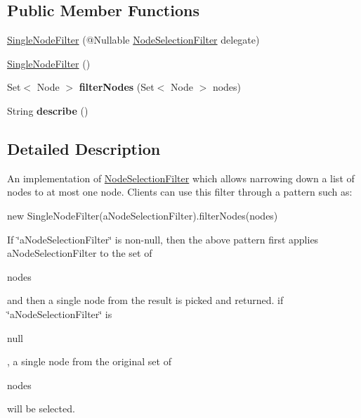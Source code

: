 \subsection*{Public Member Functions}
\begin{DoxyCompactItemize}
\item 
\hyperlink{classcom_1_1google_1_1devrel_1_1wcl_1_1filters_1_1SingleNodeFilter_a66d8bc70e29fe674e0f6030d2419281c}{Single\+Node\+Filter} (@Nullable \hyperlink{interfacecom_1_1google_1_1devrel_1_1wcl_1_1filters_1_1NodeSelectionFilter}{Node\+Selection\+Filter} delegate)
\item 
\hyperlink{classcom_1_1google_1_1devrel_1_1wcl_1_1filters_1_1SingleNodeFilter_a80572ec2194bd5b7d1a7c76ad6ae01a2}{Single\+Node\+Filter} ()
\item 
Set$<$ Node $>$ {\bfseries filter\+Nodes} (Set$<$ Node $>$ nodes)\hypertarget{classcom_1_1google_1_1devrel_1_1wcl_1_1filters_1_1SingleNodeFilter_a62c4faedd0e963a62a48838d0a4b5a95}{}\label{classcom_1_1google_1_1devrel_1_1wcl_1_1filters_1_1SingleNodeFilter_a62c4faedd0e963a62a48838d0a4b5a95}

\item 
String {\bfseries describe} ()\hypertarget{classcom_1_1google_1_1devrel_1_1wcl_1_1filters_1_1SingleNodeFilter_a28b67b1962e3d83f075ce159d10706c8}{}\label{classcom_1_1google_1_1devrel_1_1wcl_1_1filters_1_1SingleNodeFilter_a28b67b1962e3d83f075ce159d10706c8}

\end{DoxyCompactItemize}


\subsection{Detailed Description}
An implementation of \hyperlink{interfacecom_1_1google_1_1devrel_1_1wcl_1_1filters_1_1NodeSelectionFilter}{Node\+Selection\+Filter} which allows narrowing down a list of nodes to at most one node. Clients can use this filter through a pattern such as\+: 
\begin{DoxyPre}
    new SingleNodeFilter(aNodeSelectionFilter).filterNodes(nodes)
\end{DoxyPre}
 If \char`\"{}a\+Node\+Selection\+Filter\char`\"{} is non-\/null, then the above pattern first applies a\+Node\+Selection\+Filter to the set of
\begin{DoxyCode}
nodes 
\end{DoxyCode}
 and then a single node from the result is picked and returned. if \char`\"{}a\+Node\+Selection\+Filter\char`\"{} is
\begin{DoxyCode}
null 
\end{DoxyCode}
 , a single node from the original set of
\begin{DoxyCode}
nodes 
\end{DoxyCode}
 will be selected. 

